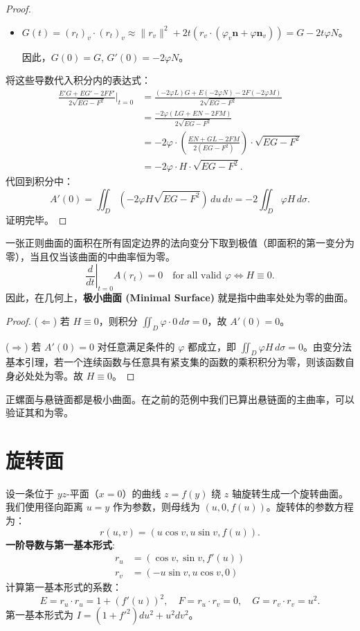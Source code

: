 \documentclass[lang=cn,10pt,thmcnt=section]{elegantbook}
\renewcommand{\vec}[1]{\mathbf{#1}}
\begin{document}
\begin{proof}
\begin{itemize}
        \item $G(t) = (r_t)_v \cdot (r_t)_v \approx \|r_v\|^2 + 2t(r_v \cdot (\varphi_v \vec{n} + \varphi \vec{n}_v)) = G - 2t\varphi N$。
        
        因此，$G(0)=G$, $G'(0) = -2\varphi N$。
    \end{itemize}
    
    将这些导数代入积分内的表达式：
    \begin{align*}
        \frac{E'G + EG' - 2FF'}{2\sqrt{EG - F^2}} \bigg|_{t=0} &= \frac{(-2\varphi L)G + E(-2\varphi N) - 2F(-2\varphi M)}{2\sqrt{EG - F^2}} \\
        &= \frac{-2\varphi (LG + EN - 2FM)}{2\sqrt{EG - F^2}} \\
        &= -2\varphi \cdot \left( \frac{EN + GL - 2FM}{2(EG-F^2)} \right) \cdot \sqrt{EG-F^2} \\
        &= -2\varphi \cdot H \cdot \sqrt{EG-F^2}.
    \end{align*}
    代回到积分中：
    \[
    A'(0) = \iint_D (-2\varphi H \sqrt{EG - F^2}) \, du \, dv = -2 \iint_D \varphi H \, d\sigma.
    \]
    证明完毕。
\end{proof}

\begin{corollary}[极小曲面的等价条件]
    一张正则曲面的面积在所有固定边界的法向变分下取到极值（即面积的第一变分为零），当且仅当该曲面的中曲率恒为零。
    \[
    \left. \frac{d}{dt} \right|_{t=0} A(r_t) = 0 \quad \text{for all valid } \varphi \iff H \equiv 0.
    \]
    因此，在几何上，\textbf{极小曲面 (Minimal Surface)} 就是指中曲率处处为零的曲面。
\end{corollary}
\begin{proof}
    ($\Leftarrow$) 若 $H \equiv 0$，则积分 $\iint_D \varphi \cdot 0 \, d\sigma = 0$，故 $A'(0)=0$。
    
    ($\Rightarrow$) 若 $A'(0)=0$ 对任意满足条件的 $\varphi$ 都成立，即 $\iint_D \varphi H \, d\sigma = 0$。由变分法基本引理，若一个连续函数与任意具有紧支集的函数的乘积积分为零，则该函数自身必处处为零。故 $H \equiv 0$。
\end{proof}

\begin{example}
    正螺面与悬链面都是极小曲面。在之前的范例中我们已算出悬链面的主曲率，可以验证其和为零。
\end{example}
\section{旋转面}
设一条位于 $yz$-平面（$x=0$）的曲线 $z=f(y)$ 绕 $z$ 轴旋转生成一个旋转曲面。我们使用径向距离 $u=y$ 作为参数，则母线为 $(u, 0, f(u))$。旋转体的参数方程为：
\[
r(u, v) = (u \cos v, u \sin v, f(u)).
\]
\textbf{一阶导数与第一基本形式}:
\begin{align*}
    r_u &= (\cos v, \sin v, f'(u)) \\
    r_v &= (-u \sin v, u \cos v, 0)
\end{align*}
计算第一基本形式的系数：
\[
E = r_u \cdot r_u = 1 + (f'(u))^2, \quad F = r_u \cdot r_v = 0, \quad G = r_v \cdot r_v = u^2.
\]
第一基本形式为 $I = (1+f'^2)du^2 + u^2 dv^2$。
\end{document}
